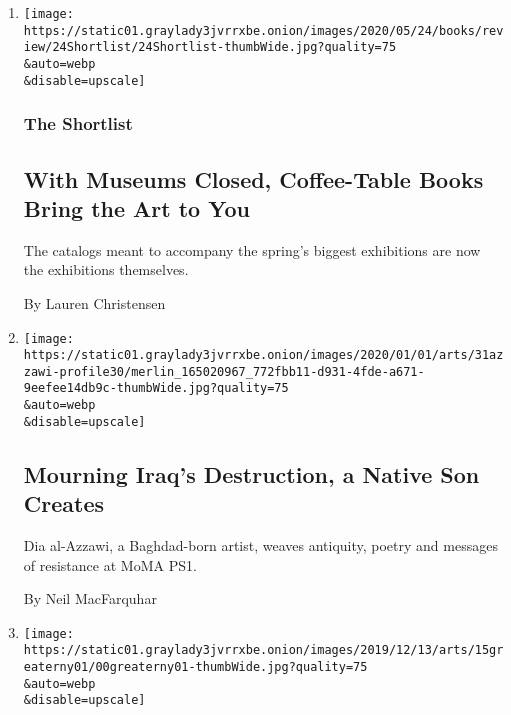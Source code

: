 \begin{enumerate}
\def\labelenumi{\arabic{enumi}.}
\item
  \href{/2020/05/22/books/review/coffee-table-art-books-gerhard-richter-basquiat.html}{}

  \texttt{[image: https://static01.graylady3jvrrxbe.onion/images/2020/05/24/books/review/24Shortlist/24Shortlist-thumbWide.jpg?quality=75\\\&auto=webp\\\&disable=upscale]}

  \hypertarget{the-shortlist}{%
  \subsubsection{The Shortlist}\label{the-shortlist}}

  \hypertarget{with-museums-closed-coffee-table-books-bring-the-art-to-you}{%
  \subsection{With Museums Closed, Coffee-Table Books Bring the Art to
  You}\label{with-museums-closed-coffee-table-books-bring-the-art-to-you}}

  The catalogs meant to accompany the spring's biggest exhibitions are
  now the exhibitions themselves.

  By Lauren Christensen
\item
  \href{/2019/12/31/arts/design/dia-al-azzawi-moma-ps1.html}{}

  \texttt{[image: https://static01.graylady3jvrrxbe.onion/images/2020/01/01/arts/31azzawi-profile30/merlin\_165020967\_772fbb11-d931-4fde-a671-9eefee14db9c-thumbWide.jpg?quality=75\\\&auto=webp\\\&disable=upscale]}

  \hypertarget{mourning-iraqs-destruction-a-native-son-creates}{%
  \subsection{Mourning Iraq's Destruction, a Native Son
  Creates}\label{mourning-iraqs-destruction-a-native-son-creates}}

  Dia al-Azzawi, a Baghdad-born artist, weaves antiquity, poetry and
  messages of resistance at MoMA PS1.

  By Neil MacFarquhar
\item
  \href{/2019/12/16/arts/design/moma-ps1-greater-new-york.html}{}

  \texttt{[image: https://static01.graylady3jvrrxbe.onion/images/2019/12/13/arts/15greaterny01/00greaterny01-thumbWide.jpg?quality=75\\\&auto=webp\\\&disable=upscale]}


\end{enumerate}
